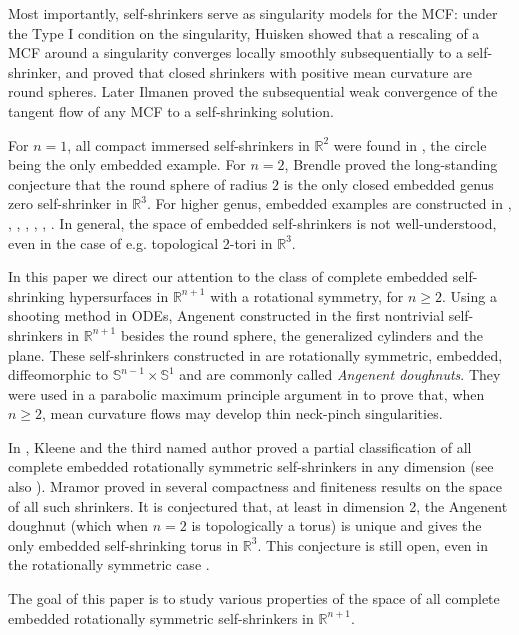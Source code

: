 \documentclass[12pt]{amsart}
\numberwithin{equation}{section}
\theoremstyle{remark}
\begin{document}
	Most importantly, self-shrinkers serve as singularity models for the MCF: under the Type I condition on the singularity, Huisken \cite{Huisken} showed that a rescaling of a MCF around a singularity converges locally smoothly subsequentially to a self-shrinker, and proved that closed shrinkers with positive mean curvature are round spheres. Later Ilmanen \cite{Ilmanen} proved the subsequential weak convergence of the tangent flow of any MCF to a self-shrinking solution. 
	
	For $n=1$, all compact immersed self-shrinkers in $\mathbb R^2$ were found in \cite{AL}, the circle being the only embedded example. For $n=2$, Brendle \cite{Brendle} proved the long-standing conjecture that the round sphere of radius $2$ is the only closed embedded genus zero self-shrinker in $\mathbb R^3$. For higher genus, embedded examples are constructed in \cite{Ang}, \cite{DN}, \cite{KKM}, \cite{Nguyen}, \cite{Ketover}, \cite{moller}, \cite{BNS}. In general, the space of embedded self-shrinkers is not well-understood, even in the case of e.g. topological 2-tori in $\mathbb{R}^3$.
	
	In this paper we direct our attention to the class of complete embedded self-shrinking hypersurfaces in $\mathbb R^{n+1}$ with a rotational symmetry, for $n\geq 2$. Using a shooting method in ODEs, Angenent constructed in \cite{Ang} the first nontrivial self-shrinkers in $\mathbb R^{n+1}$ besides the round sphere, the generalized cylinders and the plane. These self-shrinkers constructed in \cite{Ang} are rotationally symmetric, embedded, diffeomorphic to $\mathbb S^{n-1}\times \mathbb S^1$ and are commonly called {\sl Angenent doughnuts}. They were used in a parabolic maximum principle argument in \cite{Ang} to prove that, when $n\geq 2$, mean curvature flows may develop thin neck-pinch singularities.
	
	In \cite{KM}, Kleene and the third named author proved a partial classification of all complete embedded rotationally symmetric self-shrinkers in any dimension (see also \cite{Song}). Mramor proved in \cite{Alex} several compactness and finiteness results on the space of all such shrinkers. It is conjectured that, at least in dimension 2, the Angenent doughnut (which when $n=2$ is topologically a torus) is unique and gives the only embedded self-shrinking torus in $\mathbb R^3$. This conjecture is still open, even in the rotationally symmetric case \cite{DLN}. 
	
	The goal of this paper is to study various properties of the space of all complete embedded rotationally symmetric self-shrinkers in $\mathbb R^{n+1}$. 
	
\end{document}
